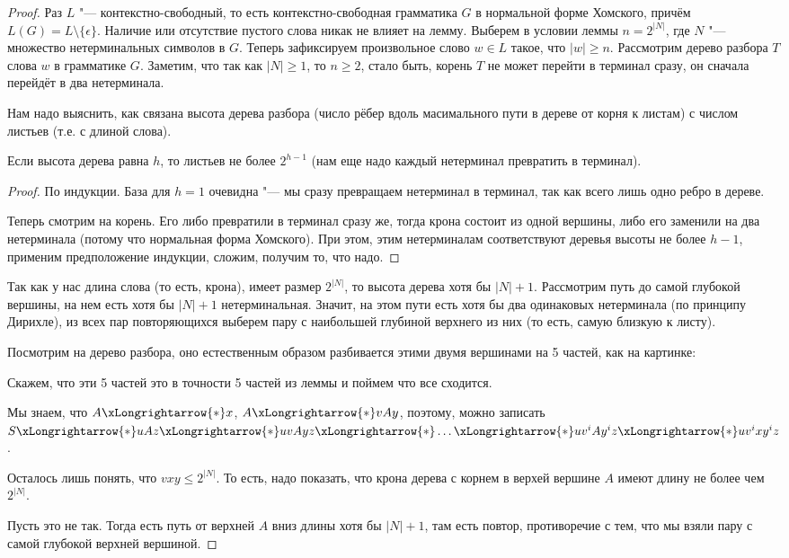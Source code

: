 \begin{proof}
    Раз $L$ "--- контекстно-свободный, то есть контекстно-свободная грамматика $G$ в нормальной
    форме Хомского, причём $L(G) = L \setminus \{ \epsilon \}$.
    Наличие или отсутствие пустого слова никак не влияет на лемму.
    Выберем в условии леммы $n=2^{|N|}$, где $N$ "--- множество нетерминальных символов в $G$.
    Теперь зафиксируем произвольное слово $w \in L$ такое, что $|w| \ge n$.
    Рассмотрим дерево разбора $T$ слова $w$ в грамматике $G$.
    Заметим, что так как $|N|\ge 1$, то $n \ge 2$, стало быть, корень $T$ не может перейти в терминал сразу,
    он сначала перейдёт в два нетерминала.

    Нам надо выяснить, как связана высота дерева разбора (число рёбер вдоль масимального пути в дереве
    от корня к листам) с числом листьев (т.е. с длиной слова).
    \begin{assertion}
        Если высота дерева равна $h$, то листьев не более $2^{h-1}$
        (нам еще надо каждый нетерминал превратить в терминал).
    \end{assertion}
    \begin{proof}
        По индукции. База для $h = 1$ очевидна "--- мы сразу превращаем нетерминал в терминал, так как всего лишь одно ребро в дереве.

        Теперь смотрим на корень. Его либо превратили в терминал сразу же, тогда крона состоит из одной вершины, либо его заменили на два нетерминала (потому что нормальная форма Хомского). 
        При этом, этим нетерминалам соответствуют деревья высоты не более $h - 1$, применим предположение индукции, сложим, получим то, что надо.
    \end{proof}
    Так как у нас длина слова (то есть, крона), имеет размер $2^{|N|}$, то высота дерева хотя бы $|N| + 1$.
    Рассмотрим путь до самой глубокой вершины, на нем есть хотя бы $|N| + 1$ нетерминальная.
    Значит, на этом пути есть хотя бы два одинаковых нетерминала (по принципу Дирихле), из всех пар повторяющихся выберем пару с наибольшей глубиной верхнего из них (то есть, самую близкую к листу).

    Посмотрим на дерево разбора, оно естественным образом разбивается этими двумя вершинами на 5 частей, как на картинке:

    Скажем, что эти 5 частей это в точности 5 частей из леммы и поймем что все сходится.

    Мы знаем, что $A \xLongrightarrow{*} x$, $A \xLongrightarrow{*} vAy$, поэтому, можно записать
    $S \xLongrightarrow{*} uAz \xLongrightarrow{*} uvAyz \xLongrightarrow{*} \dots \xLongrightarrow{*} uv^iAy^iz \xLongrightarrow{*} uv^ixy^iz$.

    Осталось лишь понять, что $vxy \leq 2^{|N|}$. То есть, надо показать, что крона дерева с корнем в верхей вершине $A$ имеют длину не более чем $2^{|N|}$.

    Пусть это не так. Тогда есть путь от верхней $A$ вниз длины хотя бы $|N| + 1$, там есть повтор, противоречие с тем, что мы взяли пару с самой глубокой верхней вершиной.
\end{proof}

